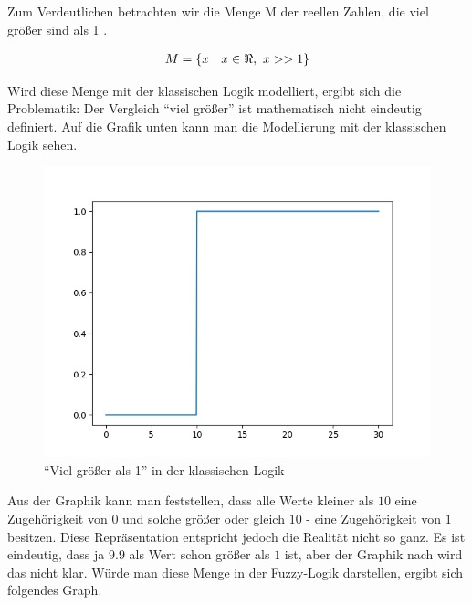 Zum Verdeutlichen betrachten wir die Menge M der reellen Zahlen, die viel größer sind als 1 \cite{CIKruse:15}. 

\begin{align}
\centering
	M = \{ x \ |\ x \in \Re,\ x >> 1\}
\end{align}

Wird diese Menge mit der klassischen Logik modelliert, ergibt sich die Problematik: Der Vergleich ``viel größer'' ist mathematisch nicht eindeutig definiert. Auf die Grafik unten kann man die Modellierung mit der klassischen Logik sehen.


\begin{figure}[htbp]
	\centering
	\includegraphics[scale=0.5]{images/classic_logic.png}
	\caption{``Viel größer als 1'' in der klassischen Logik}\label{class_dar}
\end{figure}

Aus der Graphik kann man feststellen, dass alle Werte kleiner als $10$ eine Zugehörigkeit von $0$ und solche größer oder gleich $10$ - eine Zugehörigkeit von $1$ besitzen. Diese Repräsentation entspricht jedoch die Realität nicht so ganz. Es ist eindeutig, dass ja $9.9$ als Wert schon größer als $1$ ist, aber der Graphik nach wird das nicht klar. Würde man diese Menge in der Fuzzy-Logik darstellen, ergibt sich folgendes Graph.

